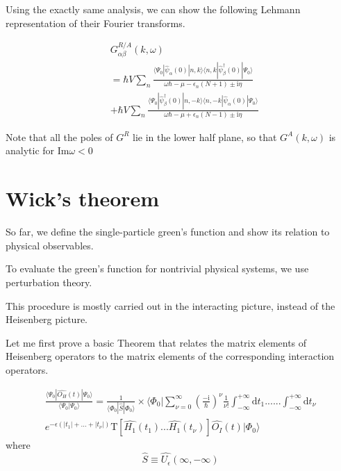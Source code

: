 Using the exactly same analysis, we can show the following Lehmann representation of their Fourier transforms.

\begin{align}\label{2.3.15}
& G^{R/A}_{\alpha\beta}(k,\omega) \nonumber \\
&=\hbar V\sum_n \frac{\langle\Psi_0|\hat \psi_{\alpha}(0)|n,k\rangle\langle n,k|\hat \psi^{
\dagger}_{\beta} (0)|\Psi_0\rangle}{\omega\hbar-\mu-\epsilon_n(N+1)\pm\mathrm{i}\eta}  \nonumber \\
&+\hbar V\sum_n \frac{\langle\Psi_0|\hat \psi^{
\dagger}_{\beta} (0)|n,-k\rangle\langle n,-k|\hat \psi_{\alpha}(0)|\Psi_0\rangle}{\omega\hbar-\mu+\epsilon_n(N-1)\pm\mathrm{i}\eta} \nonumber\tag{2.3.15A/B} 
\end{align}

Note that all the poles of $G^R$ lie in the lower half plane, so that $G^A(k,\omega)$ is analytic for $\mathrm{Im} \omega<0$



\section{Wick's theorem}

So far, we define the single-particle green's function and show its relation to physical observables.

To evaluate the green's function for nontrivial physical systems, we use perturbation theory.

This procedure is mostly carried out in the interacting picture, instead of the Heisenberg picture.

Let me first prove a basic Theorem that relates the matrix elements of Heisenberg operators to the matrix elements of the corresponding interaction operators.


\begin{align}\label{2.4.1}
\frac{\langle\Psi_0|\hat{O_H}(t)|\Psi_0\rangle}{\langle\Psi_0|\Psi_0\rangle}=\frac{1}{\langle\Phi_0|\hat{S}|\Phi_0\rangle}\times \langle\Phi_0|\sum_{\nu=0}^{\infty}(\frac{-\mathrm{i}}{\hbar})^{\nu} \frac{1}{\nu!} \int_{-\infty}^{+\infty}\mathrm{d}t_1......\int_{-\infty}^{+\infty}\mathrm{d}t_{\nu} \nonumber \\
e^{-\epsilon(|t_1|+...+|t_{\nu}|)}\mathrm{T}[\hat{H_1}(t_1)...\hat{H_1}(t_{\nu})]\hat{O_I}(t)|\Phi_0\rangle
\end{align}
where 
\begin{equation}\label{2.4.2}
\hat{S}\equiv\hat{U_{\epsilon}}(\infty,-\infty)
\end{equation}

